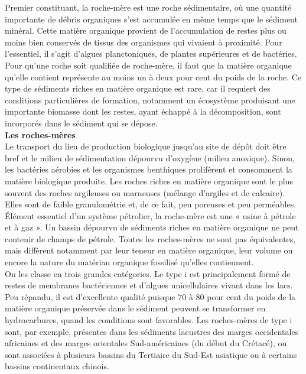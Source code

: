 \documentclass[8pt]{article}
\begin{document}
Premier constituant, la roche-mère est une roche sédimentaire, où une quantité importante de débris organiques s'est accumulée en même temps que le sédiment minéral. Cette matière organique provient de l'accumulation de restes plus ou moins bien conservés de tissus des organismes qui vivaient à proximité. Pour l'essentiel, il s'agit d'algues planctoniques, de plantes supérieures et de bactéries. Pour qu'une roche soit qualifiée de roche-mère, il faut que la matière organique qu'elle contient représente au moins un à deux pour cent du poids de la roche. Ce type de sédiments riches en matière organique est rare, car il requiert des conditions particulières de formation, notamment un écosystème produisant une importante biomasse dont les restes, ayant échappé à la décomposition, sont incorporés dans le sédiment qui se dépose.\\

\textbf{Les roches-mères}\\

Le transport du lieu de production biologique jusqu'au site de dépôt doit être bref et le milieu de sédimentation dépourvu d'oxygène (milieu anoxique). Sinon, les bactéries aérobies et les organismes benthiques prolifèrent et consomment la matière biologique produite. Les roches riches en matière organique sont le plus souvent des roches argileuses ou marneuses (mélange d'argiles et de calcaire). Elles sont de faible granulométrie et, de ce fait, peu poreuses et peu perméables. Élément essentiel d'un système pétrolier, la roche-mère est une « usine à pétrole et à gaz ». Un bassin dépourvu de sédiments riches en matière organique ne peut contenir de champs de pétrole. Toutes les roches-mères ne sont pas équivalentes, mais diffèrent notamment par leur teneur en matière organique, leur volume ou encore la nature du matériau organique fossilisé qu'elles contiennent.\\

On les classe en trois grandes catégories. Le type i est principalement formé de restes de membranes bactériennes et d'algues unicellulaires vivant dans les lacs. Peu répandu, il est d'excellente qualité puisque 70 à 80 pour cent du poids de la matière organique préservée dans le sédiment peuvent se transformer en hydrocarbures, quand les conditions sont favorables. Les roches-mères de type i sont, par exemple, présentes dans les sédiments lacustres des marges occidentales africaines et des marges orientales Sud-américaines (du début du Crétacé), ou sont associées à plusieurs bassins du Tertiaire du Sud-Est asiatique ou à certains bassins continentaux chinois.\\
\end{document}
